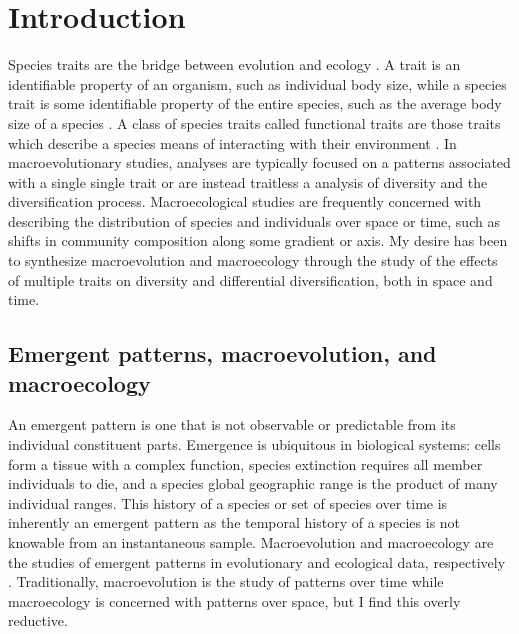 \chapter{Introduction}


Species traits are the bridge between evolution and ecology \citep{Mcgill2006,Webber2017}. A trait is an identifiable property of an organism, such as individual body size, while a species trait is some identifiable property of the entire species, such as the average body size of a species \citep{Mcgill2006}. A class of species traits called functional traits are those traits which describe a species means of interacting with their environment \citep{Mcgill2006}. In macroevolutionary studies, analyses are typically focused on a patterns associated with a single single trait or are instead traitless a analysis of diversity and the diversification process. Macroecological studies are frequently concerned with describing the distribution of species and individuals over space or time, such as shifts in community composition along some gradient or axis. My desire has been to synthesize macroevolution and macroecology through the study of the effects of multiple traits on diversity and differential diversification, both in space and time.



\section{Emergent patterns, macroevolution, and macroecology}

An emergent pattern is one that is not observable or predictable from its individual constituent parts. Emergence is ubiquitous in biological systems: cells form a tissue with a complex function, species extinction requires all member individuals to die, and a species global geographic range is the product of many individual ranges. This history of a species or set of species over time is inherently an emergent pattern as the temporal history of a species is not knowable from an instantaneous sample. Macroevolution and macroecology are the studies of emergent patterns in evolutionary and ecological data, respectively \citep{Brown1989,Brown1995,Stanley1979,Stanley1975}. Traditionally, macroevolution is the study of patterns over time while macroecology is concerned with patterns over space, but I find this overly reductive.

